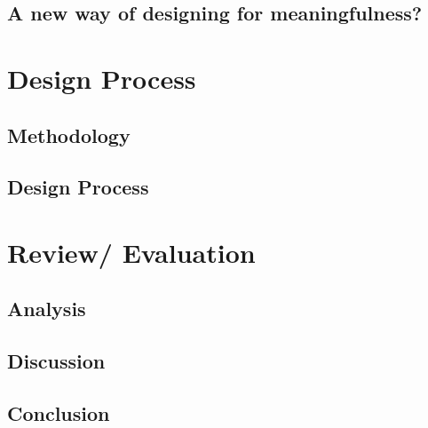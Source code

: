 \documentclass[UKenglish]{ifimaster}
\begin{document}
\chapter{ A new way of designing for meaningfulness?}



\part{Design Process}

\chapter{ Methodology}


\chapter{ Design Process}



\part{Review/ Evaluation }

\chapter{ Analysis}


\chapter{ Discussion}


\chapter{ Conclusion}


\backmatter{}

\printbibliography[nottype=online]
\printbibliography[type=online,title={Web only}]

% 
\end{document}
